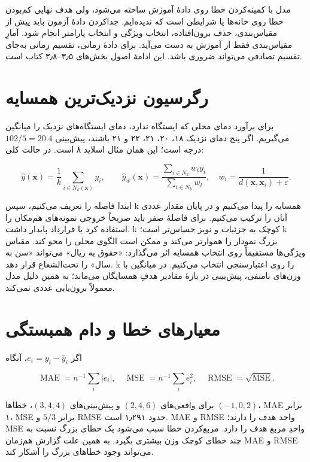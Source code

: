 مدل با کمینه‌کردن خطا روی دادهٔ آموزش ساخته می‌شود، ولی هدف نهایی کم‌بودن خطا روی خانه‌ها یا شرایطی است که ندیده‌ایم. جداکردن دادهٔ آزمون باید پیش از مقیاس‌بندی، حذف برون‌افتاده، انتخاب ویژگی و انتخاب پارامتر انجام شود. آمارِ مقیاس‌بندی فقط از آموزش به دست می‌آید. برای دادهٔ زمانی، تقسیم زمانی به‌جای تقسیم تصادفی می‌تواند ضروری باشد. این ادامهٔ اصول بخش‌های ۳٫۵--۳٫۸ کتاب است.

\section{رگرسیون نزدیک‌ترین همسایه}

برای برآورد دمای محلی که ایستگاه ندارد، دمای ایستگاه‌های نزدیک را میانگین می‌گیریم. اگر پنج دمای نزدیک ۱۸، ۲۰، ۲۱، ۲۲ و ۲۱ باشند، پیش‌بینی \(102/5=20.4\) درجه است؛ این همان مثال اسلاید ۸ است. در حالت کلی:

\[
\widehat y(\boldsymbol{x})=\frac1k\sum_{i\in N_k(\boldsymbol{x})}y_i,
\qquad
\widehat y_w(\boldsymbol{x})=\frac{\sum_{i\in N_k}w_i y_i}{\sum_{i\in N_k}w_i},
\quad w_i=\frac1{d(\boldsymbol{x},\boldsymbol{x}_i)+\varepsilon}.
\]

ابتدا فاصله را تعریف می‌کنیم، سپس k همسایه را پیدا می‌کنیم و در پایان مقدار عددی آنان را ترکیب می‌کنیم. برای فاصلهٔ صفر باید صریحاً خروجی نمونه‌های هم‌مکان را استفاده کرد یا قرارداد پایدار داشت. k کوچک به جزئیات و نویز حساس‌تر است؛ k بزرگ نمودار را هموارتر می‌کند و ممکن است الگوی محلی را محو کند. مقیاس ویژگی‌ها مستقیماً روی انتخاب همسایه اثر می‌گذارد: «حقوق به ریال» می‌تواند «سن به سال» را تحت‌الشعاع قرار دهد. k را روی اعتبارسنجی انتخاب می‌کنیم. در میانگین با وزن‌های نامنفی، پیش‌بینی در بازهٔ مقادیر هدفِ همسایگان می‌ماند؛ به همین دلیل مدل معمولاً برون‌یابی عددی نمی‌کند.

\section{معیارهای خطا و دام همبستگی}

اگر \(e_i=y_i-\widehat y_i\)، آنگاه

\[
\operatorname{MAE}=n^{-1}\sum_i|e_i|,\quad
\operatorname{MSE}=n^{-1}\sum_i e_i^2,\quad
\operatorname{RMSE}=\sqrt{\operatorname{MSE}}.
\]

برای واقعی‌های \((2,4,6)\) و پیش‌بینی‌های \((3,4,4)\)، خطاها \((-1,0,2)\)، MAE برابر ۱، MSE برابر \(5/3\) و RMSE حدود ۱٫۲۹۱ است. MAE و RMSE واحد هدف را دارند؛ MSE واحدِ مربع هدف را دارد. مربع‌کردن خطا سبب می‌شود یک خطای بزرگ نسبت به چند خطای کوچک وزن بیشتری بگیرد. به همین علت گزارش هم‌زمان MAE و RMSE می‌تواند وجود خطاهای بزرگ را آشکار کند.

